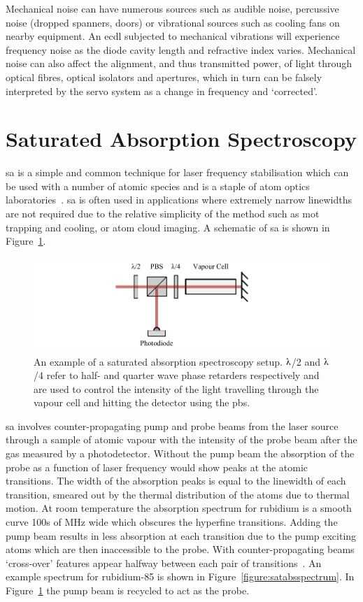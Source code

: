 Mechanical noise can have numerous sources such as audible noise, percussive noise (dropped spanners, doors) or vibrational sources such as cooling fans on nearby equipment.
An \gls{ecdl} subjected to mechanical vibrations will experience frequency noise as the diode cavity length and refractive index varies.
Mechanical noise can also affect the alignment, and thus transmitted power, of light through optical fibres, optical isolators and apertures, which in turn can be falsely interpreted by the servo system as a change in frequency and `corrected'.

\section{Saturated Absorption Spectroscopy}
\Gls{sa} is a simple and common technique for laser frequency stabilisation which can be used with a number of atomic species and is a staple of atom optics laboratories~\cite{demtroder_laser_2003}.
\Gls{sa} is often used in applications where extremely narrow linewidths are not required due to the relative simplicity of the method such as \gls{mot} trapping and cooling, or atom cloud imaging.
A schematic of \gls{sa} is shown in Figure~\ref{figure:satabs}.

\begin{figure}
\center
\includegraphics{part1/Figs/SatAbs.pdf}
\caption[Saturated absorption spectroscopy setup.]{An example of a saturated absorption spectroscopy setup. $\lambdaup$/2 and $\lambdaup$/4 refer to half- and quarter wave phase retarders respectively and are used to control the intensity of the light travelling through the vapour cell and hitting the detector using the \gls{pbs}.}
\label{figure:satabs}
\end{figure}

\Gls{sa} involves counter-propagating pump and probe beams from the laser source through a sample of atomic vapour with the intensity of the probe beam after the gas measured by a photodetector.
Without the pump beam the absorption of the probe as a function of laser frequency would show peaks at the atomic transitions.
The width of the absorption peaks is equal to the linewidth of each transition, smeared out by the thermal distribution of the atoms due to thermal motion.
At room temperature the absorption spectrum for rubidium is a smooth curve 100s of MHz wide which obscures the hyperfine transitions.
Adding the pump beam results in less absorption at each transition due to the pump exciting atoms which are then inaccessible to the probe. With counter-propagating beams `cross-over' features appear halfway between each pair of transitions~\cite{demtroder_laser_2003}.
An example spectrum for rubidium-85 is shown in Figure~\ref{figure:satabsspectrum}.
In Figure~\ref{figure:satabs} the pump beam is recycled to act as the probe.

